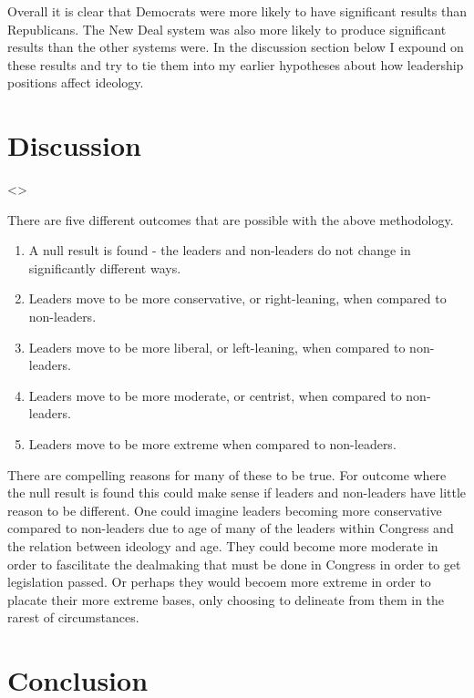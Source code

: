 \documentclass[12pt,twoside]{reedthesis}
\begin{document}
  Overall it is clear that Democrats were more likely to have significant
  results than Republicans. The New Deal system was also more likely to
  produce significant results than the other systems were. In the
  discussion section below I expound on these results and try to tie them
  into my earlier hypotheses about how leadership positions affect
  ideology.
  
  \chapter{Discussion}\label{discussion}
  
  \textless{}\textgreater{}
  
  There are five different outcomes that are possible with the above
  methodology.
  
  \begin{enumerate}
  \def\labelenumi{\arabic{enumi}.}
  \itemsep1pt\parskip0pt
  \item
    A null result is found - the leaders and non-leaders do not change in
    significantly different ways.
  \item
    Leaders move to be more conservative, or right-leaning, when compared
    to non-leaders.
  \item
    Leaders move to be more liberal, or left-leaning, when compared to
    non-leaders.
  \item
    Leaders move to be more moderate, or centrist, when compared to
    non-leaders.
  \item
    Leaders move to be more extreme when compared to non-leaders.
  \end{enumerate}
  
  There are compelling reasons for many of these to be true. For outcome
  where the null result is found this could make sense if leaders and
  non-leaders have little reason to be different. One could imagine
  leaders becoming more conservative compared to non-leaders due to age of
  many of the leaders within Congress and the relation between ideology
  and age. They could become more moderate in order to fascilitate the
  dealmaking that must be done in Congress in order to get legislation
  passed. Or perhaps they would becoem more extreme in order to placate
  their more extreme bases, only choosing to delineate from them in the
  rarest of circumstances.
  
  \chapter*{Conclusion}\label{conclusion-1}
  
\end{document}
